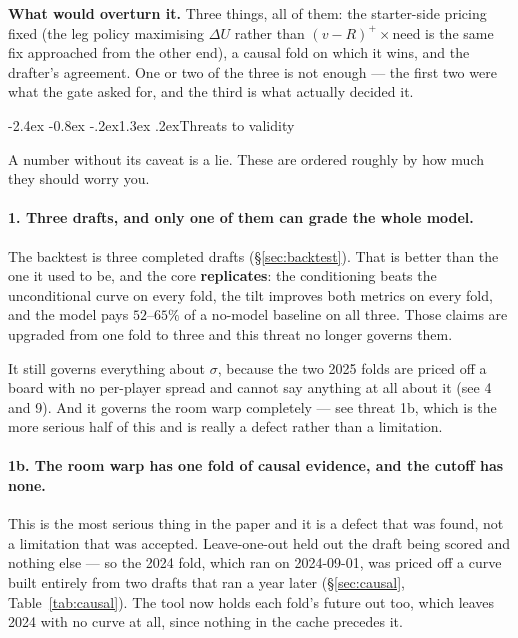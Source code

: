 \documentclass[10pt,a4paper]{article}
\makeatletter
\theoremstyle{plain}
\theoremstyle{definition}
\theoremstyle{remark}
\renewcommand\section{\@startsection{section}{1}{\z@}%
  {-2.4ex \@plus -0.8ex \@minus -.2ex}{1.3ex \@plus.2ex}{\normalfont\Large\bfseries}}
\makeatother
\begin{document}
\textbf{What would overturn it.} Three things, all of them: the starter-side pricing fixed
(the leg policy maximising $\Delta U$ rather than $(v-R)^+ \times \mathrm{need}$ is the same
fix approached from the other end), a causal fold on which it wins, and the drafter's
agreement. One or two of the three is not enough --- the first two were what the gate asked
for, and the third is what actually decided it.

\section{Threats to validity}
\label{sec:threats}

A number without its caveat is a lie. These are ordered roughly by how much they should
worry you.

\paragraph{1. Three drafts, and only one of them can grade the whole model.}
The backtest is three completed drafts (\S\ref{sec:backtest}). That is better than the one
it used to be, and the core \textbf{replicates}: the conditioning beats the unconditional
curve on every fold, the tilt improves both metrics on every fold, and the model pays
$52$--$65\%$ of a no-model baseline on all three. Those claims are upgraded from one fold
to three and this threat no longer governs them.

It still governs everything about $\sigma$, because the two 2025 folds are priced off a
board with no per-player spread and cannot say anything at all about it (see 4 and 9).
And it governs the room warp completely --- see threat 1b, which is the more serious half
of this and is really a defect rather than a limitation.

\paragraph{1b. The room warp has one fold of causal evidence, and the cutoff has none.}
This is the most serious thing in the paper and it is a defect that was found, not a
limitation that was accepted. Leave-one-out held out the draft being scored and nothing
else --- so the 2024 fold, which ran on 2024-09-01, was priced off a curve built entirely
from two drafts that ran a year later (\S\ref{sec:causal}, Table~\ref{tab:causal}). The
tool now holds each fold's future out too, which leaves 2024 with no curve at all, since
nothing in the cache precedes it.
\end{document}
